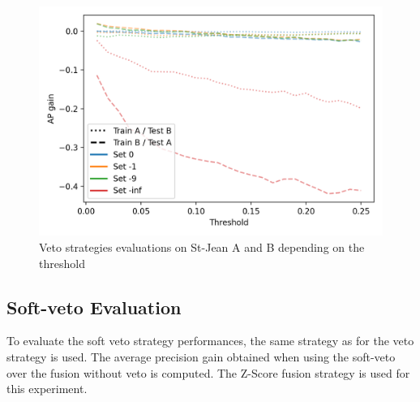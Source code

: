 \begin{figure}
  \caption{Veto strategies evaluations on St-Jean A and B depending on the threshold}
  \label{fig:veto}
  \includegraphics[width=\linewidth]{img/veto.png}
\end{figure}

\begin{table}
  \centering
  \caption{Maximal gain on the average precision using the veto and Argmax}
  \label{tab:veto}
\end{table}

\subsection{Soft-veto Evaluation}

To evaluate the soft veto strategy performances, the same strategy as for the veto strategy is used.
The average precision gain obtained when using the soft-veto over the fusion without veto is computed.
The Z-Score fusion strategy is used for this experiment.

